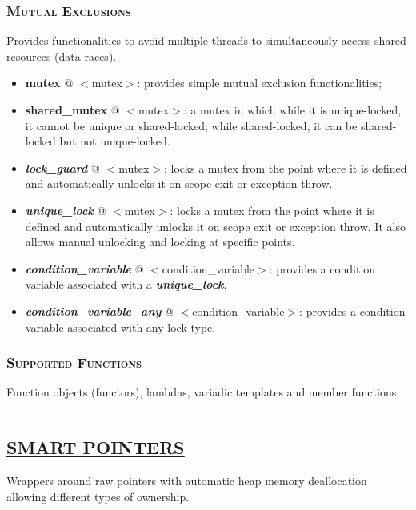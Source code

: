 \documentclass[10pt]{article}
\begin{document}
\begin{multicols*}{5}
{\subsubsection*{\textsc{Mutual Exclusions}}
\noindent
Provides functionalities to avoid multiple threads to simultaneously access shared resources (data races).
\begin{itemize}[leftmargin=*,topsep=0.25pt]
  \setlength\itemsep{-1.8pt}
	\item  {\textbf{mutex}} @ $<$mutex$>$: provides simple mutual exclusion functionalities;
	\item  {\textbf{shared\_mutex}} @ $<$mutex$>$: a mutex in which while it is unique-locked, it cannot be unique or shared-locked; while shared-locked, it can be shared-locked but not unique-locked.
	\item  {\emph{\textbf{lock\_guard}}} @ $<$mutex$>$: locks a mutex from the point where it is defined and automatically unlocks it on scope exit or exception throw.
	\item  {\emph{\textbf{unique\_lock}}} @ $<$mutex$>$: locks a mutex from the point where it is defined and automatically unlocks it on scope exit or exception throw. It also allows manual unlocking and locking at specific points.
	\item  {\emph{\textbf{condition\_variable}}} @ $<$condition\_variable$>$: provides a condition variable associated with a \emph{\textbf{unique\_lock}}.
	\item  {\emph{\textbf{condition\_variable\_any}}} @ $<$condition\_variable$>$: provides a condition variable associated with any lock type.
\end{itemize}



\subsubsection*{\textsc{Supported Functions}} 
\noindent
Function objects (functors), lambdas, variadic templates and member functions; 



}

\par\noindent\rule{155pt}{0.4pt}


{\color{Blue}
\subsection*{\href{https://en.cppreference.com/w/cpp/memory}{\underline{SMART POINTERS}}}	
\noindent
Wrappers around raw pointers with automatic heap memory deallocation allowing different types of ownership.

}
\end{multicols*}
\end{document}
